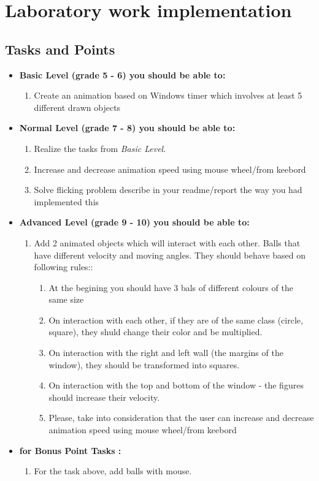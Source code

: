 \section{Laboratory work implementation}

\subsection{Tasks and Points}
\begin{itemize}
\item \textbf{Basic Level (grade 5 - 6) you should be able to:}
	\begin{enumerate}
	\item Create an animation based on Windows timer which involves at least 5 different drawn objects
      \end{enumerate}
\item \textbf{Normal Level (grade 7 - 8) you should be able to:}
      \begin{enumerate}
    \item Realize the tasks from \textit{Basic Level}.
    \item Increase and decrease animation speed using mouse wheel/from keebord
    \item Solve flicking problem describe in your readme/report the way you had implemented this
          \end{enumerate}
\item \textbf{Advanced Level (grade 9 - 10) you should be able to:}
      \begin{enumerate}
    \item Add 2 animated objects which will interact with each other. Balls that have different velocity and moving angles. They should behave based on following rules::
    	\begin{enumerate}
        \item At the begining you should have 3 bals of different colours of the same size
        \item On interaction with each other, if they are of the same class (circle, square), they shuld change their color and be multiplied.
        \item On interaction with the right and left wall (the margins of the window), they should be transformed into squares.
        \item On interaction with the top and bottom of the window - the figures should increase their velocity.
        \item Please, take into consideration that the user can increase and decrease animation speed using mouse wheel/from keebord
        \end{enumerate}
          \end{enumerate}
\item \textbf{for Bonus Point Tasks :}
\begin{enumerate}
	\item For the task above, add balls with mouse.
    \end{enumerate}
  \end{itemize}  

